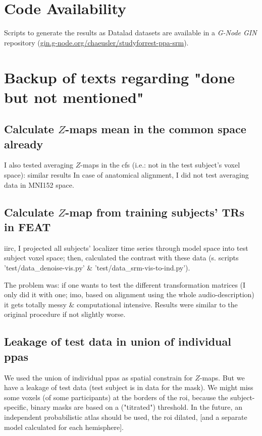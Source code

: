 \section*{Code Availability}

Scripts to generate the results as Datalad \citep{halchenko2021datalad} datasets
are available in a \emph{G-Node GIN} repository
(\href{https://gin.g-node.org/chaeusler/studyforrest-ppa-srm}{\url{gin.g-node.org/chaeusler/studyforrest-ppa-srm}}).






\pagebreak

\section{Backup of texts regarding "done but not mentioned"}


\subsection{Calculate $Z$-maps mean in the common space already}
%
I also tested averaging $Z$-maps in the \ac{cfs} (i.e.: not in the test
subject's voxel space): similar results
%
In case of anatomical alignment, I did
not test averaging data in MNI152 space.


\subsection{Calculate $Z$-map from training subjects' TRs in FEAT}

iirc, I projected all subjects' localizer time series through
model space into test subject voxel space; then, calculated the contrast
with these data (s. scripts 'test/data\_denoise-vis.py' \&
'test/data\_srm-vis-to-ind.py').
%

The problem was: if one wants to test the different transformation matrices (I
only did it with one; imo, based on alignment using the whole audio-description)
it gets totally messy \& computational intensive.
%
Results were similar to the original procedure if not slightly worse.


\subsection{Leakage of test data in union of individual \acp{ppa}}

%
We used the union of individual \acp{ppa} as spatial constrain for $Z$-maps.
%
But we have a leakage of test data (test subject is in data for the mask).
%
We might miss some voxels (of some participants) at the borders of the \ac{roi},
because the subject-specific, binary masks are based on a ("titrated")
threshold.  \citep{sengupta2016extension}
%
In the future, an independent probabilistic atlas should be used, the \ac{roi}
dilated, [and a separate model calculated for each hemisphere].
